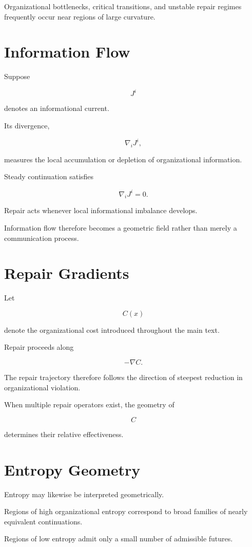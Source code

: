 \documentclass[11pt,oneside]{book}
\numberwithin{equation}{chapter}
\theoremstyle{definition}
\theoremstyle{plain}
\begin{document}
Organizational bottlenecks, critical transitions, and unstable repair
regimes frequently occur near regions of large curvature.

\section{Information Flow}

Suppose

\[
J^i
\]

denotes an informational current.

Its divergence,

\[
\nabla_iJ^i,
\]

measures the local accumulation or depletion of organizational
information.

Steady continuation satisfies

\[
\nabla_iJ^i
=
0.
\]

Repair acts whenever local informational imbalance develops.

Information flow therefore becomes a geometric field rather than merely a
communication process.

\section{Repair Gradients}

Let

\[
C(x)
\]

denote the organizational cost introduced throughout the main text.

Repair proceeds along

\[
-\nabla C.
\]

The repair trajectory therefore follows the direction of steepest
reduction in organizational violation.

When multiple repair operators exist, the geometry of

\[
C
\]

determines their relative effectiveness.

\section{Entropy Geometry}

Entropy may likewise be interpreted geometrically.

Regions of high organizational entropy correspond to broad families of
nearly equivalent continuations.

Regions of low entropy admit only a small number of admissible futures.
\end{document}
